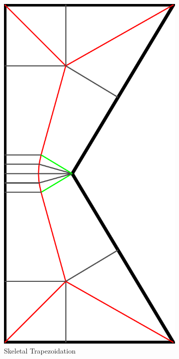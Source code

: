 \begin{figure}
\begin{subfigure}[t]{\figwidth}\centering
\includegraphics[height=\figwidthTwo]{sources/method/simple_skeleton_st}
\caption{Skeletal Trapezoidation}\label{shape_decomposition_st}
\end{subfigure}
\begin{subfigure}[t]{\figwidth}\centering

\end{subfigure}
\end{figure}

